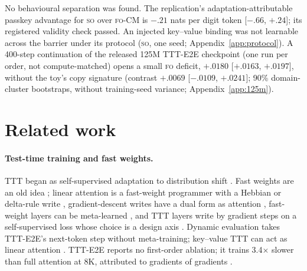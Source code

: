 \documentclass[11pt]{article}
\newcommand{\FO}{\textsc{fo}}
\newcommand{\SO}{\textsc{so}}
\begin{document}
No behavioural separation was found. The replication's adaptation-attributable passkey advantage for
\SO{} over \FO-CM{} is $-.21$ nats per digit token [$-.66$, $+.24$]; its registered validity check
passed. An injected key--value binding was not learnable across the
barrier under its protocol (\SO, one seed; Appendix~\ref{app:protocol}). A
400-step continuation of the released 125M TTT-E2E checkpoint (one run per order, not compute-matched)
opens a small \FO{} deficit, $+.0180$ [$+.0163$, $+.0197$], without the toy's copy signature (contrast
$+.0069$ [$-.0109$, $+.0241$]; 90\% domain-cluster bootstraps, without training-seed variance;
Appendix~\ref{app:125m}).

\section{Related work}
\label{sec:related}

\paragraph{Test-time training and fast weights.}
TTT began as self-supervised adaptation to distribution shift \citep{sun2020ttt}. Fast
weights are an old idea \citep{schmidhuber1992fast,ba2016fast}; linear attention is a fast-weight
programmer with a Hebbian or delta-rule write \citep{schlag2021linear,yang2024deltanet,yang2025gated},
gradient-descent writes have a dual form as attention \citep{irie2022dual}, fast-weight layers can be
meta-learned \citep{clark2022fwl}, and TTT layers write by gradient steps on a self-supervised loss
\citep{sun2024ttt,zhang2025lact,behrouz2025titans,behrouz2025atlas,feng2026inplace} whose choice is a
design axis \citep{wang2025regression,behrouz2025miras}. Dynamic evaluation \citep{krause2018dynamic}
takes TTT-E2E's next-token step without meta-training; key--value TTT can act as linear
attention \citep{liu2026kvlinear}. TTT-E2E reports no first-order ablation; it trains 3.4$\times$
slower than full attention at 8K, attributed to gradients of gradients \citep{tandon2025e2e}.
\end{document}
